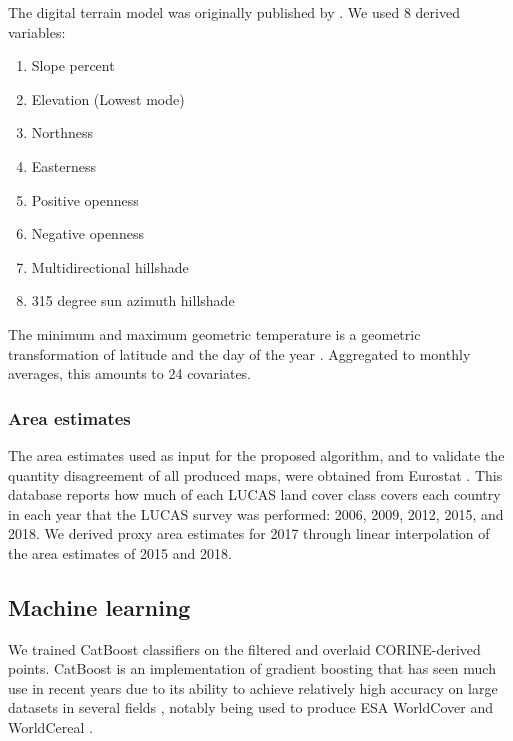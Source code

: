         The digital terrain model was originally published by \citet{hengl2020continental}. We used 8 derived variables:
        \begin{enumerate}
            \item Slope percent
            \item Elevation (Lowest mode)
            \item Northness
            \item Easterness
            \item Positive openness \citep{yokoyama2002visualizing}
            \item Negative openness \citep{yokoyama2002visualizing}
            \item Multidirectional hillshade \citep{mark1992multidirectional}
            \item 315 degree sun azimuth hillshade \citep{mark1992multidirectional}
        \end{enumerate}
        
        The minimum and maximum geometric temperature is a geometric transformation of latitude and the day of the year \citep{kilibarda2014spatio}. Aggregated to monthly averages, this amounts to 24 covariates.

    \subsubsection{Area estimates}

        The area estimates used as input for the proposed algorithm, and to validate the quantity disagreement of all produced maps, were obtained from Eurostat \citep{eurostat_lucas}. This database reports how much of each LUCAS land cover class covers each country in each year that the LUCAS survey was performed: 2006, 2009, 2012, 2015, and 2018. We derived proxy area estimates for 2017 through linear interpolation of the area estimates of 2015 and 2018.
    
    \subsection{Machine learning}
    
        We trained CatBoost classifiers on the filtered and overlaid CORINE-derived points. CatBoost is an implementation of gradient boosting \citep{prokhorenkova2018catboost} that has seen much use in recent years due to its ability to achieve relatively high accuracy on large datasets in several fields \citep{hancock2020catboost}, notably being used to produce ESA WorldCover \citep{zanaga2022esa} and WorldCereal \citep{tricht2023worldcereal}. 
        
